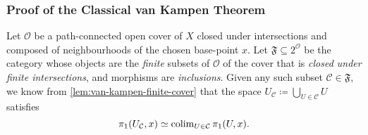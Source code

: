 \subsubsection{Proof of the Classical van Kampen Theorem}

Let \(\mathcal{O}\) be a path-connected open cover of \(X\) closed under
intersections and composed of neighbourhoods of the chosen base-point \(x\). Let
\(\mathfrak{F} \subseteq 2^{\mathcal{O}}\) be the category whose objects are the
\emph{finite} subsets of \(\mathcal{O}\) of the cover that is \emph{closed under
  finite intersections}, and morphisms are \emph{inclusions}. Given any such
subset \(\mathcal{C} \in \mathfrak F\), we know from
\cref{lem:van-kampen-finite-cover} that the space
\(U_{\mathcal{C}} \coloneq \bigcup_{U \in \mathcal{C}} U\) satisfies
\begin{equation}\label{eq:van-kampen-grp-1}
\pi_1(U_{\mathcal{C}}, x) \simeq \operatorname{colim}_{U \in \mathcal{C}} \pi_1(U, x).
\end{equation}

